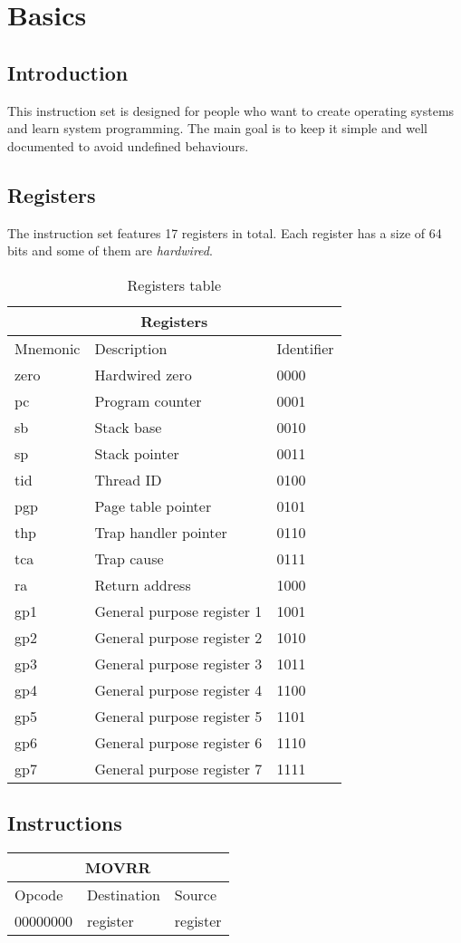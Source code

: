 \documentclass{article}
\begin{document}
\section{Basics}
\subsection{Introduction}
This instruction set is designed for people who want to create operating systems and learn system programming. The main goal is to keep it simple and well documented to avoid undefined behaviours.

\subsection{Registers}
The instruction set features 17 registers in total. Each register has a size of 64 bits and some of them are \textit{hardwired}.
\begin{table}[h!]
\centering
\begin{tabular} { | p{3cm} | | p{6cm} | p{2cm} |}
  \hline
  \multicolumn{3}{|c|}{Registers}\\
  \hline
  Mnemonic & Description & Identifier\\
  \hline
  zero & Hardwired zero & 0000\\
  pc & Program counter & 0001\\
  sb & Stack base & 0010\\
  sp & Stack pointer & 0011\\
  tid & Thread ID & 0100\\
  pgp & Page table pointer & 0101\\
  thp & Trap handler pointer & 0110\\
  tca & Trap cause & 0111\\
  ra & Return address & 1000\\
  gp1 & General purpose register 1 & 1001\\
  gp2 & General purpose register 2 & 1010\\
  gp3 & General purpose register 3 & 1011\\
  gp4 & General purpose register 4 & 1100\\
  gp5 & General purpose register 5 & 1101\\
  gp6 & General purpose register 6 & 1110\\
  gp7 & General purpose register 7 & 1111\\
  \hline
\end{tabular}
\caption{Registers table}
\end{table}

\subsection{Instructions}
\begin{table}[h!]
\centering
\begin{tabular} { | p{2cm} | | p{2cm} | p{2cm} |}
  \hline
  \multicolumn{3}{|c|}{MOVRR}\\
  \hline
  Opcode & Destination & Source\\
  \hline
  00000000 & register & register\\
  \hline
\end{tabular}
\end{table}
\end{document}

